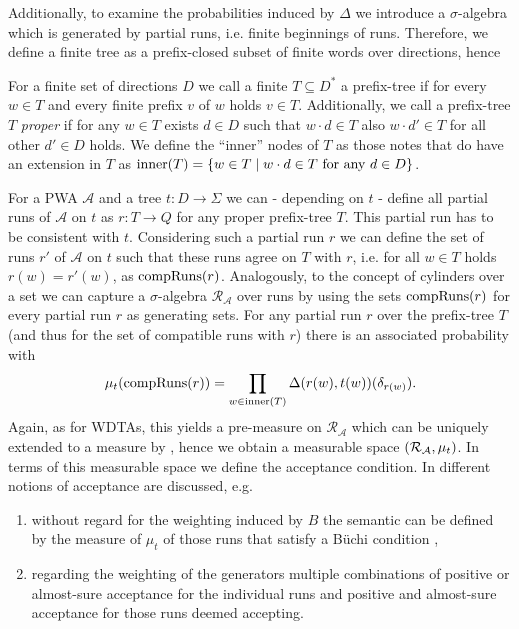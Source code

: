 Additionally, to examine the probabilities induced by $\Delta$ we introduce a
$\sigma$-algebra which is generated by partial runs, i.e. finite beginnings of
runs. Therefore, we define a finite tree as a prefix-closed subset of finite
words over directions, hence
\begin{definition}
  For a finite set of directions $D$ we call a finite $T\subseteq D^{*}$ a
  prefix-tree if for every $w\in T$ and every finite prefix $v$ of $w$ holds
  $v\in T$. Additionally, we call a prefix-tree $T$ \emph{proper} if for any
  $w\in T$ exists $d\in D$ such that $w\cdot d\in T$ also $w\cdot d'\in T$ for
  all other $d'\in D$ holds. We define the \enquote{inner} nodes of $T$ as
  those notes that do have an extension in $T$ as
  $\operatorname{inner}(T) = \left\{w\in T\mid w\cdot d\in T\text{ for any }d\in D\right\}$.
\end{definition}
For a \ac{PWA} $\mathcal{A}$ and a tree $t:D\rightarrow\Sigma$ 
we can - depending on $t$ - define all partial runs of $\mathcal{A}$ on $t$ as
$r:T\rightarrow Q$ for any proper prefix-tree $T$. This partial run has to be
consistent with $t$. Considering such a partial run $r$ we can define the set
of runs $r'$ of $\mathcal{A}$ on $t$ such that these runs agree on $T$ with
$r$, i.e. for all $w\in T$ holds $r(w) = r'(w)$, as $\operatorname{compRuns}(r)$.
Analogously, to the concept of cylinders over a set we can capture a
$\sigma$-algebra $\mathcal{R}_{\mathcal{A}}$ over runs by using the sets
$\operatorname{compRuns}(r)$ for every partial run $r$ as generating sets. For any partial
run $r$ over the prefix-tree $T$ (and thus for the set of compatible runs with
$r$) there is an associated probability with
\begin{equation*}
  \mu_{t}(\operatorname{compRuns}(r)) = \prod\limits_{w\in\operatorname{inner}(T)}
  \Delta(r(w),t(w))(\delta_{r(w)}).
\end{equation*}
Again, as for \acp{WDTA}, this yields a pre-measure on
$\mathcal{R}_{\mathcal{A}}$ which can be uniquely extended to a measure by
\cite[Theorem 5.4]{Bauer}, hence we obtain a measurable space
$\left(\mathcal{R}_{\mathcal{A}}, \mu_{t}\right)$. In terms of this measurable space
we define the acceptance condition. In \cite{RandAutoInfTrees} different
notions of acceptance are discussed, e.g.
\begin{enumerate}
  \item without regard for the weighting induced by $B$ the semantic can be
    defined by the measure of $\mu_{t}$ of those runs that satisfy a Büchi
    condition \cite[analogously to Proposition 38]{RandAutoInfTrees},
  \item regarding the weighting of the generators multiple combinations of
    positive or almost-sure acceptance for the individual runs and positive and
    almost-sure acceptance for those runs deemed accepting.
\end{enumerate}
